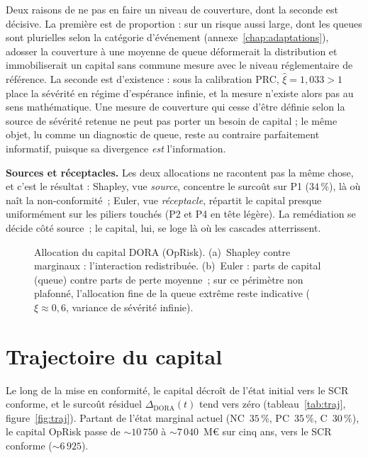Deux raisons de ne pas en faire un niveau de couverture, dont la seconde est décisive. La
première est de proportion : sur un risque aussi large, dont les queues sont plurielles selon la
catégorie d'événement (annexe~\ref{chap:adaptations}), adosser la couverture à une moyenne de queue
déformerait la distribution et immobiliserait un capital sans commune mesure avec le niveau
réglementaire de référence. La seconde est d'existence : sous la calibration PRC,
$\hat\xi=1{,}033>1$ place la sévérité en régime d'espérance infinie, et la mesure
n'existe alors pas au sens mathématique. Une mesure de couverture qui cesse d'être définie
selon la source de sévérité retenue ne peut pas porter un besoin de capital ; le même objet,
lu comme un diagnostic de queue, reste au contraire parfaitement informatif, puisque sa
divergence \emph{est} l'information.

\begin{cle}
\textbf{Sources et réceptacles.} Les deux allocations ne racontent pas la même chose, et
c'est le résultat : Shapley, vue \emph{source}, concentre le surcoût sur P1 ($34\,\%$), là
où naît la non-conformité~; Euler, vue \emph{réceptacle}, répartit le capital presque
uniformément sur les piliers touchés (P2 et P4 en tête légère). La remédiation se décide
côté source~; le capital, lui, se loge là où les cascades atterrissent.
\end{cle}

\begin{figure}[htbp]\centering
{}
\caption{Allocation du capital DORA (OpRisk). (a)~Shapley contre marginaux : l'interaction
redistribuée. (b)~Euler : parts de capital (queue) contre parts de perte moyenne~; sur ce
périmètre non plafonné, l'allocation fine de la queue extrême reste indicative
($\xi \approx 0{,}6$, variance de sévérité infinie).}
\label{fig:allocation}
\end{figure}

\section{Trajectoire du capital}

Le long de la mise en conformité, le capital décroît de l'état initial vers le SCR conforme, et
le surcoût résiduel $\Delta_{\text{DORA}}(t)$ tend vers zéro (tableau~\ref{tab:traj},
figure~\ref{fig:traj}). Partant de l'état marginal actuel (NC~$35\,\%$, PC~$35\,\%$, C~$30\,\%$),
le capital OpRisk passe de $\sim 10\,750$ à $\sim 7\,040$~M\euro{} sur cinq ans, vers le SCR
conforme ($\sim 6\,925$).

